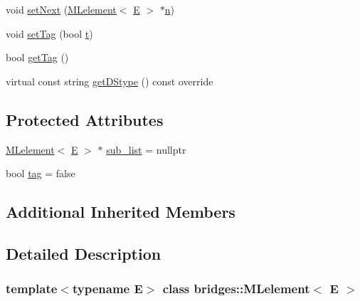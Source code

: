 \begin{DoxyCompactItemize}
\item 
void \mbox{\hyperlink{classbridges_1_1_m_lelement_aec9747cee60fcafbe474709a9dad21dc}{set\+Next}} (\mbox{\hyperlink{classbridges_1_1_m_lelement}{M\+Lelement}}$<$ \mbox{\hyperlink{namespacebridges_acfb0a4f7877d8f63de3e6862004c50eda3a3ea00cfc35332cedf6e5e9a32e94da}{E}} $>$ $\ast$\mbox{\hyperlink{namespacebridges_acfb0a4f7877d8f63de3e6862004c50eda7b8b965ad4bca0e41ab51de7b31363a1}{n}})
\item 
void \mbox{\hyperlink{classbridges_1_1_m_lelement_a525e43688c15f38382b2d471e1b8d39f}{set\+Tag}} (bool \mbox{\hyperlink{namespacebridges_acfb0a4f7877d8f63de3e6862004c50edae358efa489f58062f10dd7316b65649e}{t}})
\item 
bool \mbox{\hyperlink{classbridges_1_1_m_lelement_a7ac084867fd83d7742f0a305e44e523a}{get\+Tag}} ()
\item 
virtual const string \mbox{\hyperlink{classbridges_1_1_m_lelement_af6e8a50c38e6481ce2c569d0174c564e}{get\+D\+Stype}} () const override
\end{DoxyCompactItemize}
\subsection*{Protected Attributes}
\begin{DoxyCompactItemize}
\item 
\mbox{\hyperlink{classbridges_1_1_m_lelement}{M\+Lelement}}$<$ \mbox{\hyperlink{namespacebridges_acfb0a4f7877d8f63de3e6862004c50eda3a3ea00cfc35332cedf6e5e9a32e94da}{E}} $>$ $\ast$ \mbox{\hyperlink{classbridges_1_1_m_lelement_aa664b4e694c08e5cc31cc9d317dda100}{sub\+\_\+list}} = nullptr
\item 
bool \mbox{\hyperlink{classbridges_1_1_m_lelement_a0285a07355b2bc3d064c30e20aa2fd55}{tag}} = false
\end{DoxyCompactItemize}
\subsection*{Additional Inherited Members}


\subsection{Detailed Description}
\subsubsection*{template$<$typename E$>$\newline
class bridges\+::\+M\+Lelement$<$ E $>$}

